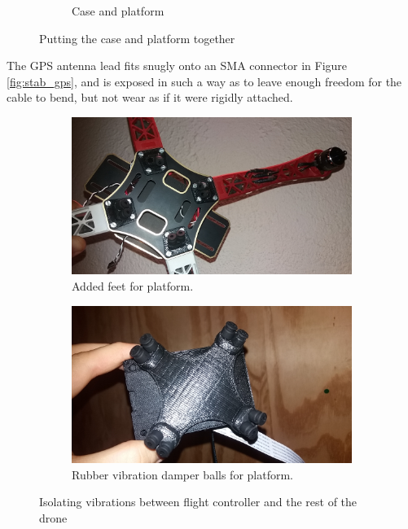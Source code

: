 \begin{figure}[H]
\begin{subfigure}{0.5\textwidth}
\caption{Case and platform}
\label{fig:stab_case_plat}
\end{subfigure}
\caption{Putting the case and platform together}
\label{fig:stabilize_platform}
\end{figure}

The GPS antenna lead fits snugly onto an SMA connector in Figure \ref{fig:stab_gps}, and is exposed in such a way as to leave enough freedom for the cable to bend, but not wear as if it were rigidly attached.

\begin{figure}[H]
\begin{subfigure}{0.5\textwidth}
\centering
\includegraphics[scale=0.1]{images/drone-build-feet.jpg}
\caption{Added feet for platform.} 
\label{fig:feet}
\end{subfigure}
\begin{subfigure}{0.5\textwidth}
\centering
\includegraphics[scale=0.1]{images/drone-build-damper-balls.jpg}
\caption{Rubber vibration damper balls for platform.}
\label{fig:balls}
\end{subfigure}
\caption{Isolating vibrations between flight controller and the rest of the drone}
\label{fig:stabilize_platform}
\end{figure}

